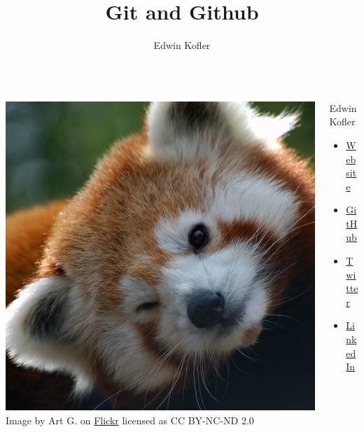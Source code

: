 \documentclass{beamer}
\title{Git and Github}
\author{Edwin Kofler}
\begin{document}
\frame{\titlepage}

\begin{frame}
	\begin{columns}
		\begin{column}{0.48\textwidth}
			\includegraphics{panda-500px.jpg} \newline
			{ \tiny Image by Art G. on \href{https://www.flickr.com/photos/digitalart/4084550022}{Flickr} licensed as CC BY-NC-ND 2.0 }
	  \end{column}
	  \begin{column}{0.48\textwidth}
			{\Huge Edwin Kofler} \newline
			\begin{itemize}
				\item \href{https://edwinkofler.com/}{Website}
				\item \href{https://github.com/hyperupcall}{GitHub}
				\item \href{https://twitter.com/hyperupcall}{Twitter}
				\item \href{https://www.linkedin.com/in/hyperupcall}{LinkedIn}
			\end{itemize}
	  \end{column}
	\end{columns}
\end{frame}
\end{document}

